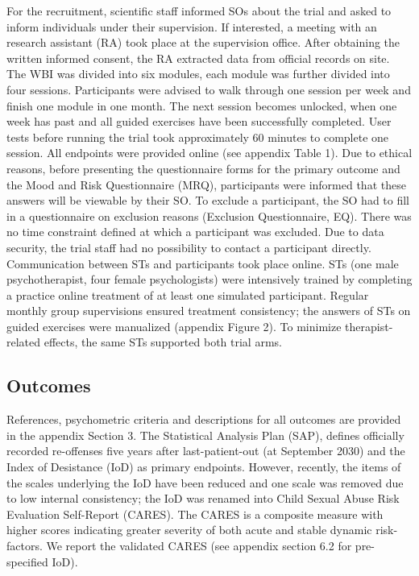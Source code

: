 \documentclass[
  super,
  preprint,
  1p,
  onecolumn]{elsarticle}
\begin{document}
\newpage{}

For the recruitment, scientific staff informed SOs about the trial and
asked to inform individuals under their supervision. If interested, a
meeting with an research assistant (RA) took place at the supervision
office. After obtaining the written informed consent, the RA extracted
data from official records on site. The WBI was divided into six
modules, each module was further divided into four sessions.
Participants were advised to walk through one session per week and
finish one module in one month. The next session becomes unlocked, when
one week has past and all guided exercises have been successfully
completed. User tests before running the trial took approximately 60
minutes to complete one session. All endpoints were provided online (see
appendix Table 1). Due to ethical reasons, before presenting the
questionnaire forms for the primary outcome and the Mood and Risk
Questionnaire (MRQ), participants were informed that these answers will
be viewable by their SO. To exclude a participant, the SO had to fill in
a questionnaire on exclusion reasons (Exclusion Questionnaire, EQ).
There was no time constraint defined at which a participant was
excluded. Due to data security, the trial staff had no possibility to
contact a participant directly. Communication between STs and
participants took place online. STs (one male psychotherapist, four
female psychologists) were intensively trained by completing a practice
online treatment of at least one simulated participant. Regular monthly
group supervisions ensured treatment consistency; the answers of STs on
guided exercises were manualized (appendix Figure 2). To minimize
therapist-related effects, the same STs supported both trial arms.

\subsection{Outcomes}\label{outcomes}

References, psychometric criteria and descriptions for all outcomes are
provided in the appendix Section 3. The Statistical Analysis Plan (SAP),
defines officially recorded re-offenses five years after
last-patient-out (at September 2030) and the Index of Desistance (IoD)
as primary endpoints. \citep{frombergerMyTabuAPlaceboControlled2021}
However, recently, the items of the scales underlying the IoD have been
reduced and one scale was removed due to low internal consistency; the
IoD was renamed into Child Sexual Abuse Risk Evaluation Self-Report
(CARES). The CARES is a composite measure with higher scores indicating
greater severity of both acute and stable dynamic risk-factors.
\citep{sonjaetzlerDevelopmentInitialValidationsubmitted} We report the
validated CARES (see appendix section 6.2 for pre-specified IoD).
\end{document}
